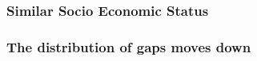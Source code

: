 \documentclass{beamer}
\begin{document}
\begin{frame}
    \label{update_scott}
    \frametitle{Similar Socio Economic Status}
        {
    }
\end{frame}





\begin{frame}
    \label{update_scott}
    \frametitle{The distribution of gaps moves down}
        {
    }
\end{frame}
\end{document}
